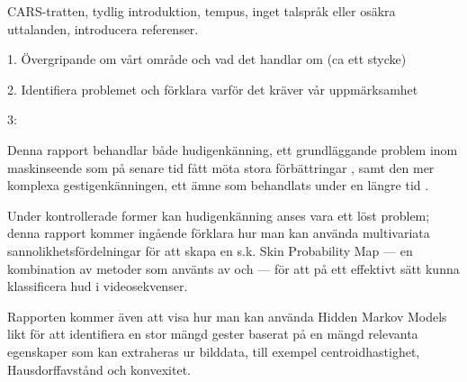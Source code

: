 \documentclass[../rapport_MVEX01-11-05]{subfiles}
\begin{document}
CARS-tratten, tydlig introduktion, tempus, inget talspråk eller osäkra
uttalanden, introducera referenser.

1. Övergripande om vårt område och vad det handlar om (ca ett stycke)

2. Identifiera problemet och förklara varför det kräver vår uppmärksamhet

3:

Denna rapport behandlar både hudigenkänning, ett grundläggande problem
inom maskinseende som på senare tid fått möta stora förbättringar
\cite{Kakumanu07}, samt den mer komplexa gestigenkänningen, ett ämne
som behandlats under en längre tid \cite{Zabulis09}.

Under kontrollerade former kan hudigenkänning anses vara ett löst
problem; denna rapport kommer ingående förklara hur man kan använda
multivariata sannolikhetsfördelningar för att skapa en s.k. Skin
Probability Map --- en kombination av metoder som använts av
 och  --- för att på ett
effektivt sätt kunna klassificera hud i videosekvenser.

Rapporten kommer även att visa hur man kan använda Hidden Markov
Models likt  för att identifiera en stor mängd
gester baserat på en mängd relevanta egenskaper som kan extraheras ur
bilddata, till exempel centroidhastighet, Hausdorffavstånd
 och konvexitet.
\end{document}
